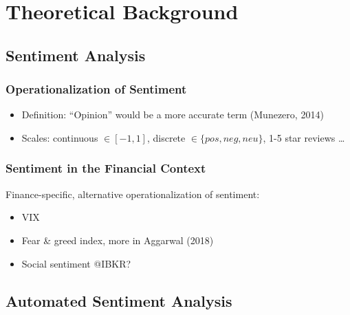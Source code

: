 \section{Theoretical Background}



\subsection{Sentiment Analysis}  %

\subsubsection{Operationalization of Sentiment}
\begin{itemize}[noitemsep]
	\item Definition: ``Opinion'' would be a more accurate term (Munezero, 2014)
	\item Scales: continuous $\in [-1, 1]$, discrete $\in \{pos, neg, neu\}$, 1-5 star reviews \dots
\end{itemize}

\subsubsection{Sentiment in the Financial Context}

Finance-specific, alternative operationalization of sentiment:
\begin{itemize}[noitemsep]
	\item VIX
	\item Fear \& greed index, more in Aggarwal (2018)
	\item Social sentiment @IBKR?
\end{itemize}

\subsection{Automated Sentiment Analysis}


